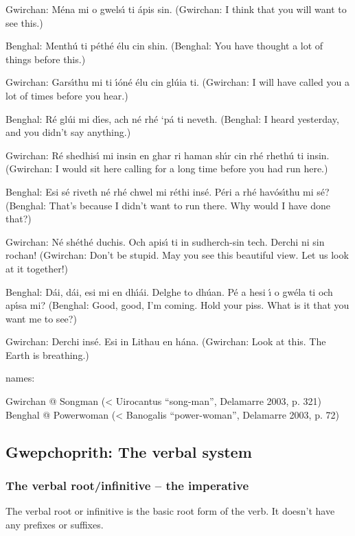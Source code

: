 Gwirchan: M\'{e}na mi o gwels\'{\i} ti \'{a}pis sin.
(Gwirchan: I think that you will want to see this.)

Benghal: Menth\'{u} ti p\'{e}th\'{e} \'{e}lu cin shin.
(Benghal: You have thought a lot of things before this.)

Gwirchan: Gars\'{\i}thu mi ti \'{\i}\'{o}n\'{e} \'{e}lu cin gl\'{u}ia ti.
(Gwirchan: I will have called you a lot of times before you hear.)

Benghal: R\'{e} gl\'{u}i mi d\'{\i}es, ach n\'{e} rh\'{e} ‘p\'{a} ti neveth.
(Benghal: I heard yesterday, and you didn’t say anything.)

Gwirchan: R\'{e} shedhis\'{\i} mi insin en ghar ri haman sh\'{\i}r cin rh\'{e} rheth\'{u} ti insin.
(Gwirchan: I would sit here calling for a long time before you had run here.)

Benghal: Esi s\'{e} riveth n\'{e} rh\'{e} chwel mi r\'{e}thi ins\'{e}. P\'{e}ri a rh\'{e} hav\'{o}s\'{\i}thu mi s\'{e}?
(Benghal: That’s because I didn’t want to run there. Why would I have done that?)

Gwirchan: N\'{e} sh\'{e}th\'{e} duchis. Och apis\'{\i} ti in sudherch-sin tech. Derchi ni sin rochan!
(Gwirchan: Don't be stupid. May you see this beautiful view. Let us look at it together!)

Benghal: D\'{a}i, d\'{a}i, esi mi en dh\'{\i}\'{a}i. Delghe to dh\'{u}an. P\'{e} a hesi \'{\i} o gw\'{e}la ti och ap\'{\i}sa mi?
(Benghal: Good, good, I'm coming. Hold your piss. What is it that you want me to see?)

Gwirchan: Derchi ins\'{e}. Esi in Lithau en h\'{a}na.
(Gwirchan: Look at this. The Earth is breathing.)

names: 

Gwirchan @ Songman (< Uirocantus ``song-man'', Delamarre 2003, p. 321)
Benghal @ Powerwoman (< Banogalis ``power-woman'', Delamarre 2003, p. 72)

\subsection{Gwepchoprith: The verbal system}
\subsubsection{The verbal root/infinitive – the imperative}

The verbal root or infinitive is the basic root form of the verb. It doesn’t have any prefixes or suffixes. 

